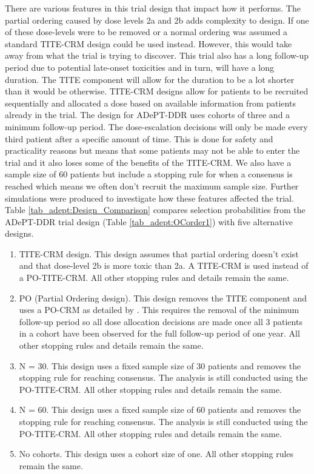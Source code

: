 There are various features in this trial design that impact how it performs. The partial ordering caused by dose levels 2a and 2b adds complexity to design. If one of these dose-levels were to be removed or a normal ordering was assumed a standard TITE-CRM design could be used instead. However, this would take away from what the trial is trying to discover. This trial also has a long follow-up period due to potential late-onset toxicities and in turn, will have a long duration. The TITE component will allow for the duration to be a lot shorter than it would be otherwise. TITE-CRM designs allow for patients to be recruited sequentially and allocated a dose based on available information from patients already in the trial. The design for ADePT-DDR uses cohorts of three and a minimum follow-up period. The dose-escalation decisions will only be made every third patient after a specific amount of time. This is done for safety and practicality reasons but means that some patients may not be able to enter the trial and it also loses some of the benefits of the TITE-CRM. We also have a sample size of 60 patients but include a stopping rule for when a consensus is reached which means we often don't recruit the maximum sample size. Further simulations were produced to investigate how these features affected the trial. Table \ref{tab_adept:Design_Comparison} compares selection probabilities from the ADePT-DDR trial design (Table \ref{tab_adept:OCorder1}) with five alternative designs. 
 
\begin{enumerate}
	\item TITE-CRM design. This design assumes that partial ordering doesn't exist and that dose-level 2b is more toxic than 2a. A TITE-CRM is used instead of a PO-TITE-CRM. All other stopping rules and details remain the same. 
	\item PO (Partial Ordering design). This design removes the TITE component and uses a PO-CRM as detailed by \cite{wagesContinualReassessmentMethod2011}. This requires the removal of the minimum follow-up period so all dose allocation decisions are made once all 3 patients in a cohort have been observed for the full follow-up period of one year. All other stopping rules and details remain the same. 
	\item N = 30. This design uses a fixed sample size of 30 patients and removes the stopping rule for reaching consensus. The analysis is still conducted using the PO-TITE-CRM. All other stopping rules and details remain the same. 
	\item N = 60. This design uses a fixed sample size of 60 patients and removes the stopping rule for reaching consensus. The analysis is still conducted using the PO-TITE-CRM. All other stopping rules and details remain the same. 
	\item No cohorts. This design uses a cohort size of one. All other stopping rules remain the same. 
\end{enumerate} 

